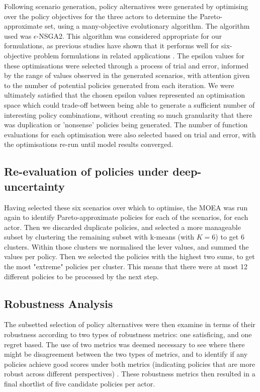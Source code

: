 Following scenario generation, policy alternatives were generated by optimising over the policy objectives for the three actors to determine the Pareto-approximate set, using a many-objective evolutionary algorithm. The algorithm used was $\epsilon$-NSGA2. This algorithm was considered appropriate for our formulations, as previous studies have shown that it performs well for six-objective problem formulations in related applications \parencite{salazar_diagnostic_2016}. The epsilon values for these optimisations were selected through a process of trial and error, informed by the range of values observed in the generated scenarios, with attention given to the number of potential policies generated from each iteration. We were ultimately satisfied that the chosen epsilon values represented an optimisation space which could trade-off between being able to generate a sufficient number of interesting policy combinations, without creating so much granularity that there was duplication or 'nonsense' policies being generated. The number of function evaluations for each optimisation were also selected based on trial and error, with the optimisations re-run until model results converged.

\subsection{Re-evaluation of policies under deep-uncertainty}
Having selected these six scenarios over which to optimise, the MOEA was run again to identify Pareto-approximate policies for each of the scenarios, for each actor. Then we discarded duplicate policies, and selected a more manageable subset by clustering the remaining subset with k-means (with $K=6$) to get 6 clusters. Within those clusters we normalised the lever values, and summed the values per policy. Then we selected the policies with the highest two sums, to get the most "extreme" policies per cluster. This means that there were at most 12 different policies to be processed by the next step.

\subsection{Robustness Analysis}
The subsetted selection of policy alternatives were then examine in terms of their robustness according to two types of robustness metrics: one satisficing, and one regret based. The use of two metrics was deemed necessary to see where there might be disagreement between the two types of metrics, and to identify if any policies achieve good scores under both metrics (indicating  policies that are more robust across different perspectives) \parencite{mcphail_robustness_2018}. These robustness metrics then resulted in a final shortlist of five candidate policies per actor.

